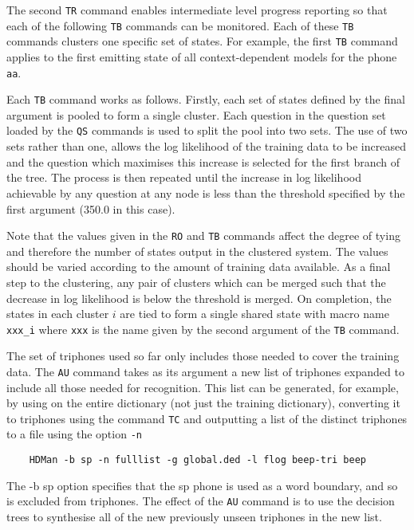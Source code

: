 The second \texttt{TR} command enables intermediate level progress reporting so
that each of the following \texttt{TB} commands
can be monitored.  Each of these \texttt{TB} commands
clusters one specific set of states.  For example, the first \texttt{TB}
command applies to the first emitting state of all context-dependent models for
the phone \texttt{aa}.

Each \texttt{TB} command works as follows.  Firstly, each set of states defined
by the final argument is pooled to form a single cluster.  Each question in the
question set loaded by the \texttt{QS} commands is used to split the pool into
two sets.  The use of two sets rather than one, allows the log likelihood of
the training data to be increased and the question which maximises this
increase is selected for the first branch of the tree. The process is then
repeated until the increase in log likelihood achievable by any question at any
node is less than the threshold specified by the first argument (350.0 in this
case).

Note that the values given in the \texttt{RO} and \texttt{TB} commands affect
the degree of tying and therefore the number of states output in the clustered
system.  The values should be varied according to the amount of training data
available.
As a final step to the clustering, any pair of clusters which can be merged
 such that the decrease in log likelihood is below
the threshold is merged.  On completion, the states in each cluster $i$ are
tied to form a single shared state with macro name \texttt{xxx\_i} where
\texttt{xxx} is the name given by the second argument of the \texttt{TB}
command.

The set of triphones used so far only includes those needed to cover the
training data. The \texttt{AU} command takes as its argument a new list of
triphones expanded to include all those needed for recognition.  This list can
be generated, for example, by using  on the entire dictionary (not
just the training dictionary), converting it to triphones using the command
\texttt{TC} and outputting a list of the distinct triphones to a file using the
option \texttt{-n} 

\begin{verbatim}
    HDMan -b sp -n fulllist -g global.ded -l flog beep-tri beep
\end{verbatim}

\noindent
The -b sp option specifies that the sp phone is used as a word boundary, and so 
is excluded from triphones.  The effect of the \texttt{AU} command is to use the 
decision trees to synthesise all of the new previously unseen triphones in the new 
list.

